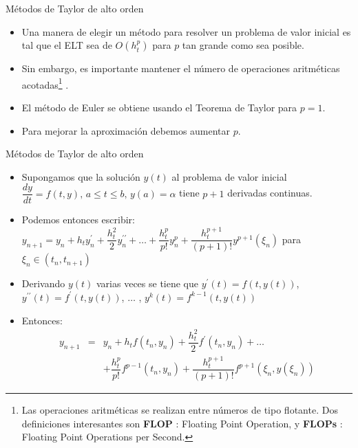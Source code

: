 \documentclass{beamer}
\begin{document}
\begin{frame}{Métodos de Taylor de alto orden}
\begin{itemize}
	\item Una manera de elegir un método para resolver un problema de valor inicial es tal que el ELT sea de $O(h_t^p)$ para $p$ tan grande como sea posible.
	\item Sin embargo, es importante mantener el número de operaciones aritméticas acotadas\footnote{Las operaciones aritméticas se realizan entre números de tipo flotante. Dos definiciones interesantes son \textbf{FLOP} : Floating Point Operation, y \textbf{FLOPs} : Floating Point Operations per Second. } .
	\item El método de Euler se obtiene usando el Teorema de Taylor para $p=1$.
	\item Para mejorar la aproximación debemos aumentar $p$.
\end{itemize}
\end{frame}

\begin{frame}{Métodos de Taylor de alto orden}

\begin{itemize}
	\item Supongamos que la solución $y(t)$ al problema de valor inicial
	$\dfrac{dy}{dt} = f(t,y), \, a \leq t \leq b, \, y(a) = \alpha $ tiene $p+1$ derivadas continuas.
	\item Podemos entonces escribir:
	$y_{n+1}  =  y_n + h_t y_n^\prime + \dfrac{h_t^2}{2} y_n^{\prime\prime} + \dots + \dfrac{h_t^p}{p!} y_n^{p} + \dfrac{h_t^{p+1}}{(p+1)!} y^{p+1}(\xi_n)$
	 para  $\xi_n \in (t_n, t_{n+1})$
	 \item Derivando $y(t)$ varias veces se tiene que $y^\prime(t) = f(t,y(t))$, $y^{\prime\prime}(t) = f^\prime(t,y(t))$, $\dots$ , $y^{k}(t) = f^{k-1}(t,y(t))$
	 \item Entonces:
	 \begin{eqnarray}
	y_{n+1}  & = & y_n + h_t f(t_n,y_n) + \dfrac{h_t^2}{2} f^\prime(t_n,y_n) + \dots \nonumber\\ 
	& & + \dfrac{h_t^p}{p!} f^{p-1}(t_n,y_n)+ \dfrac{h_t^{p+1}}{(p+1)!} f^{p+1}(\xi_n, y(\xi_n)) \label{eq:TaylorHO}
	\end{eqnarray}	 
\end{itemize}

\end{frame}
\end{document}
